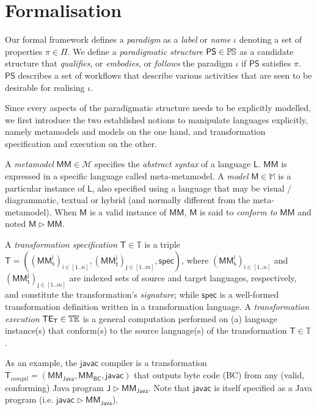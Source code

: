 \section{Formalisation}
\label{sec:Formalisation}

Our formal framework defines a \emph{paradigm} as a \emph{label} or \emph{name}
$\iota$ denoting a set of properties $\pi\in\Pi$.
We define a \emph{paradigmatic structure} $\mathsf{PS}\in \mathbb{P}\mskip-1mu\mathbb{S}$ as a candidate
structure that \emph{qualifies}, or \emph{embodies}, or \emph{follows} the
paradigm $\iota$ if $\mathsf{PS}$ satisfies $\pi$.
$\mathsf{PS}$ describes a set of workflows that describe various activities that
are seen to be desirable for realising $\iota$.

Since every aspects of the paradigmatic structure needs to be explicitly
modelled, we first introduce the two established notions to manipulate languages
explicitly, namely metamodels and models on the one hand, and transformation
specification and execution on the other.

A \emph{metamodel} $\mathsf{MM} \in \mathcal{M}$ specifies the \emph{abstract 
syntax} of a language $\mathsf{L}$. $\mathsf{MM}$ is expressed in a specific 
language called meta-metamodel. 
A \emph{model} $\mathsf{M} \in \mathbb{M}$ is a particular instance of 
$\mathsf{L}$, also specified using a language that may be visual / 
diagrammatic, textual or hybrid (and normally different from the 
meta-metamodel). When $\mathsf{M}$ is a valid instance of 
$\mathsf{MM}$, $\mathsf{M}$ is said to \emph{conform to} $\mathsf{MM}$ and noted 
$\mathsf{M} \rhd \mathsf{MM}$. 

A \emph{transformation specification} $\mathsf{T}\in\mathbb{T}$ is a triple 
$\mathsf{T} = ((\mathsf{MM_s^{i}})_{\mathsf{i}\in [1..n]}, 
(\mathsf{MM_t^{j}})_{\mathsf{j}\in[1..m]}, \mathsf{spec})$, where  
$(\mathsf{MM_s^{i}})_{\mathsf{i}\in [1..n]}$ and
$(\mathsf{MM_t^{j}})_{\mathsf{j}\in [1..m]}$ are indexed sets of source and
target languages, respectively, and constitute the transformation's 
\emph{signature}; while $\mathsf{spec}$ is a well-formed 
transformation definition written in a transformation language. A 
\emph{transformation execution} $\mathsf{TE_{T}}\in\mathbb{T}\mskip-1mu\mathbb{E}$ is a general 
computation performed on (a) language instance(s) that conform(s) to the 
source language(s) of the transformation $\mathsf{T}\in\mathbb{T}$.

As an example, the $\mathsf{javac}$ compiler is a transformation
$\mathsf{T}_{compil} = (\mathsf{MM_{Java}}, \mathsf{MM_{BC}}, \mathsf{javac})$
that outputs byte code (BC) from any (valid, conforming) Java program
$\mathsf{J}  \rhd \mathsf{MM_{Java}}$.
Note that $\mathsf{javac}$ is itself specified as a Java program (i.e.
$\mathsf{javac} \rhd \mathsf{MM_{Java}}$).

